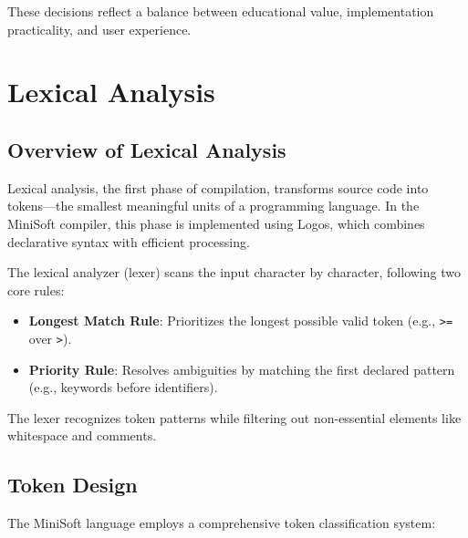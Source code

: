 \documentclass[12pt,a4paper]{article}
\begin{document}
These decisions reflect a balance between educational value, implementation practicality, and user experience.

\section{Lexical Analysis}
\subsection{Overview of Lexical Analysis}
Lexical analysis, the first phase of compilation, transforms source code into tokens—the smallest meaningful units of a programming language. In the MiniSoft compiler, this phase is implemented using Logos, which combines declarative syntax with efficient processing.

The lexical analyzer (lexer) scans the input character by character, following two core rules:

\begin{itemize}
    \item \textbf{Longest Match Rule}: Prioritizes the longest possible valid token (e.g., \texttt{>=} over \texttt{>}).
    
    \item \textbf{Priority Rule}: Resolves ambiguities by matching the first declared pattern (e.g., keywords before identifiers).
\end{itemize}

The lexer recognizes token patterns while filtering out non-essential elements like whitespace and comments.

\subsection{Token Design}
The MiniSoft language employs a comprehensive token classification system:
\end{document}
